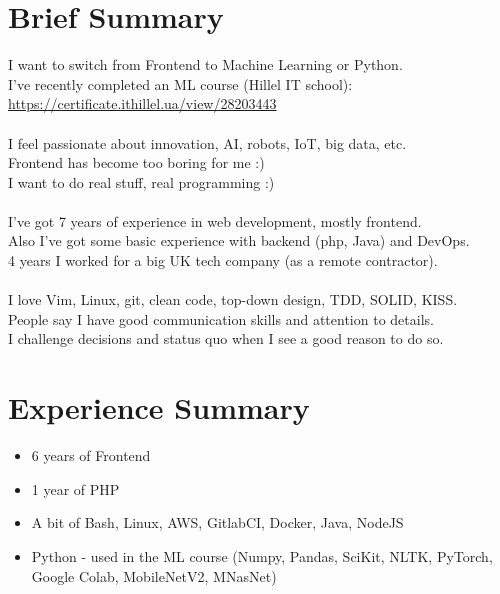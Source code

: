 \documentclass[a4paper, 14pt]{article}
\begin{document}
\begin{center}
	\textsc{\Huge{}}
\end{center}


\section{Brief Summary}
  I want to switch from Frontend to Machine Learning or Python. \\
  I've recently completed an ML course (Hillel IT school): \\
  \url{https://certificate.ithillel.ua/view/28203443} \\
  \\
  I feel passionate about innovation, AI, robots, IoT, big data, etc. \\
  Frontend has become too boring for me :) \\
  I want to do real stuff, real programming :) \\
  \\
  I've got 7 years of experience in web development, mostly frontend.  \\
  Also I've got some basic experience with backend (php, Java) and DevOps.  \\
  4 years I worked for a big UK tech company (as a remote contractor). \\
  \\
  I love Vim, Linux, git, clean code, top-down design, TDD, SOLID, KISS. \\
  People say I have good communication skills and attention to details. \\
  I challenge decisions and status quo when I see a good reason to do so.

\section{Experience Summary}
  \begin{itemize}
    \item 6 years of Frontend  \\
    \item 1 year of PHP \\
    \item A bit of Bash, Linux, AWS, GitlabCI, Docker, Java, NodeJS \\
    \item Python - used in the ML course (Numpy, Pandas, SciKit, NLTK, PyTorch, Google Colab, MobileNetV2, MNasNet) 
  \end{itemize}
\end{document}
